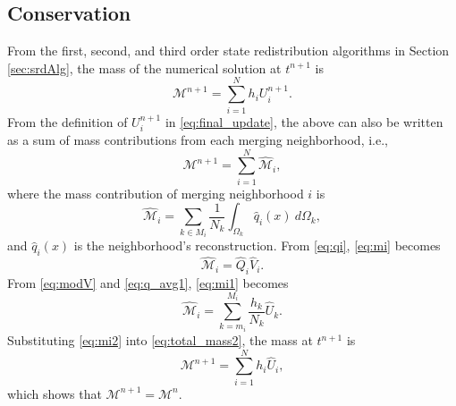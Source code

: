\subsection{Conservation}
From the first, second, and third order state redistribution algorithms in Section \ref{sec:srdAlg}, the mass of the numerical solution at $t^{n+1}$ is
\begin{equation}\label{eq:total_mass}
\mathcal{M}^{n+1} = \sum^N_{i=1} h_i U^{n+1}_i.
\end{equation}
From the definition of $U^{n+1}_i$ in \eqref{eq:final_update}, the above can also be written as a sum of mass contributions from each merging neighborhood, i.e.,
\begin{equation}\label{eq:total_mass2}
\mathcal{M}^{n+1} = \sum^N_{i=1} \hat{\mathcal{M}}_i,
\end{equation}
where the mass contribution of merging neighborhood $i$ is
\begin{equation}\label{eq:mi}
\hat{\mathcal{M}}_i = \sum_{k \in M_i}\frac{1}{N_k} \int_{\Omega_k}\hat q_i(x) ~d\Omega_k,
\end{equation}
and $\hat q_i(x)$ is the neighborhood's reconstruction.  From \eqref{eq:qi}, \eqref{eq:mi} becomes
\begin{equation}\label{eq:mi1}
\hat{\mathcal{M}}_i = \hat Q_i \hat V_i.
\end{equation}
From \eqref{eq:modV} and \eqref{eq:q_avg1}, \eqref{eq:mi1} becomes
\begin{equation}\label{eq:mi2}
\hat{\mathcal{M}}_i = \sum^{M_i}_{k = m_i}\frac{h_k}{N_k} \hat U_{k}.
\end{equation}
Substituting \eqref{eq:mi2} into \eqref{eq:total_mass2}, the mass at $t^{n+1}$ is
$$
\mathcal{M}^{n+1} = \sum^{N}_{i=1} h_i \hat U_i,
$$
which shows that $\mathcal{M}^{n+1}  = \mathcal{M}^{n} $.
